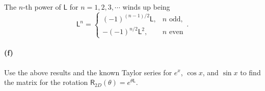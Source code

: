 \documentclass{article}
\begin{document}
\paragraph{}
The $n$-th power of $\mathsf{L}$ for $n=1,2,3,\cdots$ winds up being
	\begin{equation*}
		\mathsf{L}^{n} = \begin{cases}
			(-1)^{(n-1)/2}\mathsf{L},	& \mbox{$n$ odd},\\
			-(-1)^{n/2}\mathsf{L}^{2},	& \mbox{$n$ even}
		\end{cases}.
	\end{equation*}


\paragraph{(f)}
Use the above results and the known Taylor series for $e^{x}$, $\cos x$, and $\sin x$ to find the matrix for the rotation $\mathsf{R}_{2D}(\theta) = e^{\theta \mathsf{L}}$.
\end{document}
